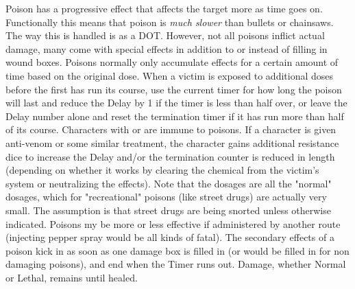 Poison has a progressive effect that affects the target more as time goes on. Functionally this means that poison is \textit{much slower} than bullets or chainsaws. The way this is handled is as a DOT. However, not all poisons inflict actual damage, many come with special effects in addition to or instead of filling in wound boxes. Poisons normally only accumulate effects for a certain amount of time based on the original dose. When a victim is exposed to additional doses before the first has run its course, use the current timer for how long the poison will last and reduce the Delay by 1 if the timer is less than half over, or leave the Delay number alone and reset the termination timer if it has run more than half of its course. Characters with  or  are immune to poisons. If a character is given anti-venom or some similar treatment, the character gains additional resistance dice to increase the Delay and/or the termination counter is reduced in length (depending on whether it works by clearing the chemical from the victim's system or neutralizing the effects). Note that the dosages are all the "normal" dosages, which for "recreational" poisons (like street drugs) are actually very small. The assumption is that street drugs are being snorted unless otherwise indicated. Poisons my be more or less effective if administered by another route (injecting pepper spray would be all kinds of fatal). The secondary effects of a poison kick in as soon as one damage box is filled in (or would be filled in for non damaging poisons), and end when the Timer runs out. Damage, whether Normal or Lethal, remains until healed.

